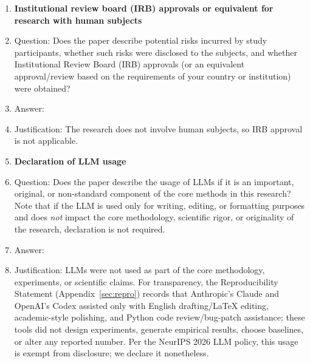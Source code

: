 \begin{enumerate}
\item {\bf Institutional review board (IRB) approvals or equivalent for research with human subjects}
    \item[] Question: Does the paper describe potential risks incurred by study participants, whether such risks were disclosed to the subjects, and whether Institutional Review Board (IRB) approvals (or an equivalent approval/review based on the requirements of your country or institution) were obtained?
    \item[] Answer: \answerNA{}
    \item[] Justification: The research does not involve human subjects, so IRB approval is not applicable.

\item {\bf Declaration of LLM usage}
    \item[] Question: Does the paper describe the usage of LLMs if it is an important, original, or non-standard component of the core methods in this research? Note that if the LLM is used only for writing, editing, or formatting purposes and does \emph{not} impact the core methodology, scientific rigor, or originality of the research, declaration is not required.
    \item[] Answer: \answerNA{}
    \item[] Justification: LLMs were not used as part of the core methodology, experiments, or scientific claims. For transparency, the Reproducibility Statement (Appendix~\ref{sec:repro}) records that Anthropic's Claude and OpenAI's Codex assisted only with English drafting/LaTeX editing, academic-style polishing, and Python code review/bug-patch assistance; these tools did not design experiments, generate empirical results, choose baselines, or alter any reported number. Per the NeurIPS 2026 LLM policy, this usage is exempt from disclosure; we declare it nonetheless.

\end{enumerate}
